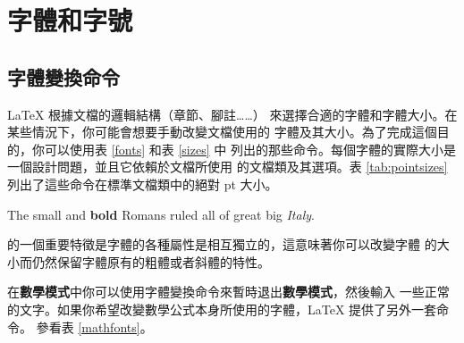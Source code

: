 \section{字體和字號}

\subsection{字體變換命令}
 \LaTeX{} 根據文檔的邏輯結構（章節、腳註……）
來選擇合適的字體和字體大小。在某些情況下，你可能會想要手動改變文檔使用的
字體及其大小。為了完成這個目的，你可以使用表 \ref{fonts} 和表 \ref{sizes} 中
列出的那些命令。每個字體的實際大小是一個設計問題，並且它依賴於文檔所使用
的文檔類及其選項。表 \ref{tab:pointsizes} 列出了這些命令在標準文檔類中的絕對 pt 大小。

\begin{example}
{\small The small and
\textbf{bold} Romans ruled}
{\Large all of great big
\textit{Italy}.}
\end{example}

\LaTeXe{} 的一個重要特徵是字體的各種屬性是相互獨立的，這意味著你可以改變字體
的大小而仍然保留字體原有的粗體或者斜體的特性。

在\textbf{數學模式}中你可以使用字體變換命令來暫時退出\textbf{數學模式}，然後輸入
一些正常的文字。如果你希望改變數學公式本身所使用的字體，\LaTeX{} 提供了另外一套命令。
參看表 \ref{mathfonts}。

